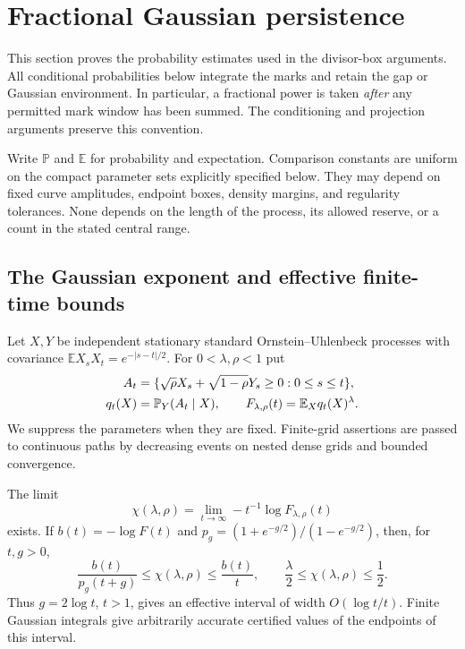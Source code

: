 \section{Fractional Gaussian persistence}
\label{pr:section}


This section proves the probability estimates used in the divisor-box
arguments. All conditional probabilities below integrate the marks and
retain the gap or Gaussian environment. In particular, a fractional power
is taken \emph{after} any permitted mark window has been summed. The
conditioning and projection arguments preserve this convention.

Write $\mathbb P$ and $\mathbb E$ for probability and expectation. Comparison
constants are uniform on the compact parameter sets explicitly specified
below. They may depend on fixed curve amplitudes, endpoint boxes, density
margins, and regularity tolerances. None depends on the length of the
process, its allowed reserve, or a count in the stated central range.

\subsection{The Gaussian exponent and effective finite-time bounds}

Let $X,Y$ be independent stationary standard Ornstein--Uhlenbeck processes
with covariance $\mathbb E X_sX_t=e^{-|s-t|/2}$. For $0<\lambda,\rho<1$ put
\begin{align}
 A_t&=\{\sqrt\rho X_s+\sqrt{1-\rho}Y_s\ge0:0\le s\le t\},\notag\\
 q_t(X)&=\mathbb P_Y(A_t\mid X),\qquad
 F_{\lambda,\rho}(t)=\mathbb E_X q_t(X)^\lambda. \label{pr:defF}
\end{align}
We suppress the parameters when they are fixed. Finite-grid assertions
are passed to continuous paths by decreasing events on nested dense grids
and bounded convergence.

\begin{proposition}\label{pr:existence}
The limit
\[
 \chi(\lambda,\rho)=\lim_{t\to\infty}-t^{-1}\log F_{\lambda,\rho}(t)
\]
exists. If $b(t)=-\log F(t)$ and
$p_g=(1+e^{-g/2})/(1-e^{-g/2})$, then, for $t,g>0$,
\begin{equation}
 \frac{b(t)}{p_g(t+g)}\le\chi(\lambda,\rho)
             \le\frac{b(t)}t,
 \qquad \frac\lambda2\le\chi(\lambda,\rho)\le\frac12.
 \label{pr:effective}
\end{equation}
Thus $g=2\log t$, $t>1$, gives an effective interval of width
$O(\log t/t)$. Finite Gaussian integrals give arbitrarily accurate
certified values of the endpoints of this interval.
\end{proposition}

